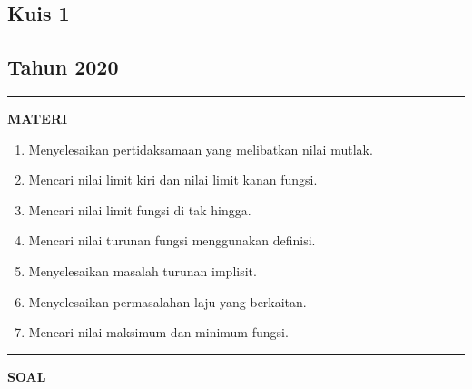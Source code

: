 \begin{flushright}
    \section*{\Large{Kuis 1}}
    \subsection*{Tahun 2020}
\end{flushright}
\vspace{0.5cm}
\hrule height 2pt
\vspace{0.5cm}
\begin{center}
    \textbf{\large{MATERI}}
    \begin{enumerate}[leftmargin=*, label={\arabic*}.]
        \item Menyelesaikan pertidaksamaan yang melibatkan nilai mutlak.
        \item Mencari nilai limit kiri dan nilai limit kanan fungsi.
        \item Mencari nilai limit fungsi di tak hingga.
        \item Mencari nilai turunan fungsi menggunakan definisi.
        \item Menyelesaikan masalah turunan implisit.
        \item Menyelesaikan permasalahan laju yang berkaitan.
        \item Mencari nilai maksimum dan minimum fungsi.
    \end{enumerate}
\end{center}
\vspace{0.2cm}
\hrule height 1pt
\vspace{0.5cm}
\begin{center}
    \textbf{\large{SOAL}}
\end{center}
